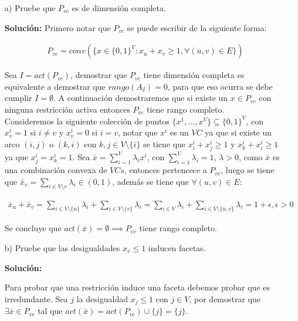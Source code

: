 \documentclass[10pt]{article}
\theoremstyle{plain}
\theoremstyle{definition}
\begin{document}
\begin{itemize}
\item[a)] Pruebe que $P_{vc}$ es de dimensión completa.

\textbf{Solución:}
Primero notar que $P_{vc}$ se puede escribir de la siguiente forma:

\begin{align*}
P_{vc} = conv(\{x\in\{0,1\}^{V}: x_{u}+x_{v}\geq 1, \forall (u,v) \in E\})
\end{align*}


Sea $I=act(P_{vc})$, demostrar que $P_{vc}$ tiene dimensión completa es equivalente a demostrar que $rango(A_{I})=0$, para que eso ocurra se debe cumplir $I=\emptyset$. A continuación demostraremos que si existe un $x\in P_{vc}$ con ninguna restricción activa entonces $P_{vc}$ tiene rango completo.\\

Consideremos la siguiente colección de puntos $\{x^{1}, \ldots, x^{V}\}\subseteq\{0,1\}^{V}$, con $x^{i}_{v}=1$ si $i\neq v$ y $x^{i}_{v}=0$ si $i=v$, notar que $x^{i}$ es un $VC$ ya que si existe un arco $(i,j)$ o $(k,i)$ con $k,j \in V\setminus\{i\}$ se tiene que $x^{i}_{i}+x^{i}_{j}\geq1$ y $x^{i}_{k}+x^{i}_{i}\geq1$ ya que $x^{i}_{j}=x^{i}_{k}=1$. Sea $\bar{x}=\sum_{i=1}^{V}\lambda_{i}x^{i}$, con $\sum_{i=1}^{V}\lambda_{i}=1$, $\lambda>0$, como $\bar{x}$ es una combinación convexa de $VCs$, entonces pertencece a $P_{vc}$, luego se tiene que $\bar{x}_{v}=\sum_{i \in V\setminus{v}}\lambda_{i} \in (0,1)$, además se tiene que $\forall (u,v) \in E$:

\begin{align*}
\bar{x}_{u}+\bar{x}_{v}=\sum_{i \in V\setminus\{u\}}\lambda_{i}+\sum_{i \in V\setminus\{v\}}\lambda_{i}=\sum_{i \in V}\lambda_{i} +\sum_{i\in V\setminus\{u,v\}}\lambda_{i}=1+\epsilon, \epsilon>0
\end{align*}


Se concluye que $act(\bar{x})=\emptyset \implies P_{vc}$ tiene rango completo.

\item[b)] Pruebe que las desigualdades $x_{v}\leq1$ inducen facetas.

\textbf{Solución:}

Para probar que una restricción induce una faceta debemos probar que es irredundante. Sea $j$ la desigualdad $x_{j}\leq 1$ con $j\in V$, por demostrar que $\exists \bar{x} \in P_{vc}$ tal que $act(\bar{x})=act(P_{vc})\cup\{j\}=\{j\}$.


\end{itemize}
\end{document}

